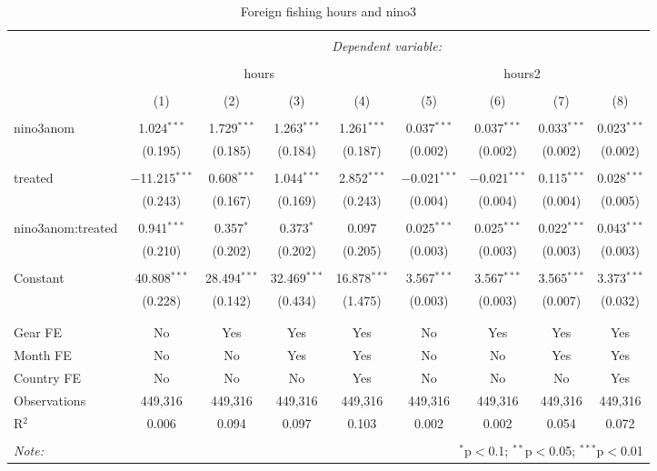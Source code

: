 
\begin{table}[!htbp] \centering 
  \caption{\label{tab:ff_reg}Foreign fishing hours and nino3} 
  \label{} 
\small 
\begin{tabular}{@{\extracolsep{5pt}}lcccccccc} 
\\[-1.8ex]\hline 
\hline \\[-1.8ex] 
 & \multicolumn{8}{c}{\textit{Dependent variable:}} \\ 
\cline{2-9} 
\\[-1.8ex] & \multicolumn{4}{c}{hours} & \multicolumn{4}{c}{hours2} \\ 
\\[-1.8ex] & (1) & (2) & (3) & (4) & (5) & (6) & (7) & (8)\\ 
\hline \\[-1.8ex] 
 nino3anom & 1.024$^{***}$ & 1.729$^{***}$ & 1.263$^{***}$ & 1.261$^{***}$ & 0.037$^{***}$ & 0.037$^{***}$ & 0.033$^{***}$ & 0.023$^{***}$ \\ 
  & (0.195) & (0.185) & (0.184) & (0.187) & (0.002) & (0.002) & (0.002) & (0.002) \\ 
  & & & & & & & & \\ 
 treated & $-$11.215$^{***}$ & 0.608$^{***}$ & 1.044$^{***}$ & 2.852$^{***}$ & $-$0.021$^{***}$ & $-$0.021$^{***}$ & 0.115$^{***}$ & 0.028$^{***}$ \\ 
  & (0.243) & (0.167) & (0.169) & (0.243) & (0.004) & (0.004) & (0.004) & (0.005) \\ 
  & & & & & & & & \\ 
 nino3anom:treated & 0.941$^{***}$ & 0.357$^{*}$ & 0.373$^{*}$ & 0.097 & 0.025$^{***}$ & 0.025$^{***}$ & 0.022$^{***}$ & 0.043$^{***}$ \\ 
  & (0.210) & (0.202) & (0.202) & (0.205) & (0.003) & (0.003) & (0.003) & (0.003) \\ 
  & & & & & & & & \\ 
 Constant & 40.808$^{***}$ & 28.494$^{***}$ & 32.469$^{***}$ & 16.878$^{***}$ & 3.567$^{***}$ & 3.567$^{***}$ & 3.565$^{***}$ & 3.373$^{***}$ \\ 
  & (0.228) & (0.142) & (0.434) & (1.475) & (0.003) & (0.003) & (0.007) & (0.032) \\ 
  & & & & & & & & \\ 
\hline \\[-1.8ex] 
Gear FE & No & Yes & Yes & Yes & No & Yes & Yes & Yes \\ 
Month FE & No & No & Yes & Yes & No & No & Yes & Yes \\ 
Country FE & No & No & No & Yes & No & No & No & Yes \\ 
Observations & 449,316 & 449,316 & 449,316 & 449,316 & 449,316 & 449,316 & 449,316 & 449,316 \\ 
R$^{2}$ & 0.006 & 0.094 & 0.097 & 0.103 & 0.002 & 0.002 & 0.054 & 0.072 \\ 
\hline 
\hline \\[-1.8ex] 
\textit{Note:}  & \multicolumn{8}{r}{$^{*}$p$<$0.1; $^{**}$p$<$0.05; $^{***}$p$<$0.01} \\ 
\end{tabular} 
\end{table} 
